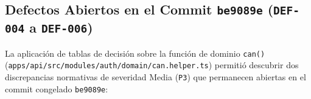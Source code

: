 \documentclass[stu,12pt,a4paper]{apa7}
\begin{document}
\subsection{\texorpdfstring{Defectos Abiertos en el Commit \texttt{be9089e} (\texttt{DEF-{}\allowbreak{}004} a \texttt{DEF-{}\allowbreak{}006})}{Defectos Abiertos en el Commit  ( a )}}\label{defectos-abiertos-en-el-commit-be9089e-def-004-a-def-006}

La aplicación de tablas de decisión sobre la función de dominio \texttt{can(\allowbreak{})\allowbreak{}} (\texttt{apps/\allowbreak{}api/\allowbreak{}src/\allowbreak{}modules/\allowbreak{}auth/\allowbreak{}domain/\allowbreak{}can.\allowbreak{}helper.\allowbreak{}ts}) permitió descubrir dos discrepancias normativas de severidad Media (\texttt{P3}) que permanecen abiertas en el commit congelado \texttt{be9089e}:
\end{document}
